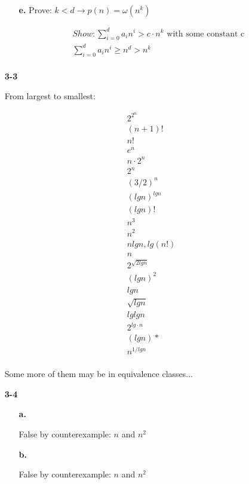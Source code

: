 \documentclass{article}
\begin{document}
\begin{enumerate}
\begin{enumerate}
	\item[\textbf{e.}] Prove: $ k < d \rightarrow p(n) = \omega(n^k) $

	\begin{align*}
		& Show: \sum_{i=0}^d a_i n^i > c \cdot n^k \text{    with some constant c} \\
		& \sum_{i=0}^d a_i n^i \geq n^d > n^k \\
	\end{align*}

\end{enumerate}

\item[\textbf{3-3}]

From largest to smallest:

\begin{align*}
& 2^{2^n} \\
& (n+1)! \\
& n! \\
& e^n \\
& n \cdot 2^n \\
& 2^n \\
& (3/2)^n \\
& (lg n)^{lg n} \\
& (lg n)! \\
& n^3 \\
& n^2 \\
& n lg n, lg(n!) \\
& n \\
& 2^{\sqrt{2 lg n}} \\
& (lg n)^2 \\
& lg n \\
& \sqrt{lg n} \\
& lg lg n \\
& 2^{lg \cdot n} \\
& (lg n)* \\
& n^{1/lg n} \\
\end{align*} 

Some more of them may be in equivalence classes...

\item[\textbf{3-4}]

\begin{enumerate}
\item[\textbf{a.}]

False by counterexample: $n$ and $n^2$

\item[\textbf{b.}]

False by counterexample: $n$ and $n^2$


\end{enumerate}
\end{enumerate}
\end{document}
